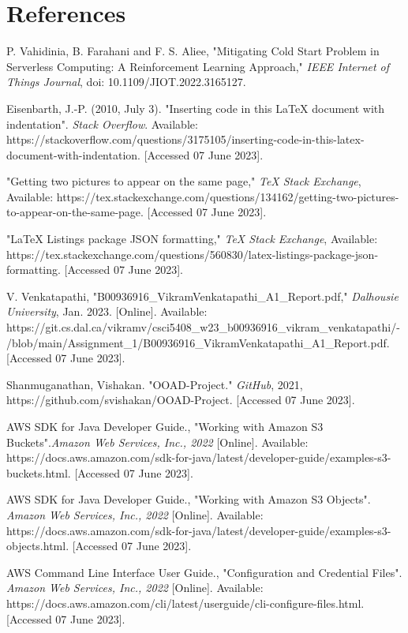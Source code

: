 
\section*{References}
\begin{sloppypar}

  \begin{enumerate}[label={[\arabic*]}]
    \item P.  Vahidinia,  B.  Farahani  and F.  S.  Aliee,  "Mitigating Cold Start  Problem in  Serverless  Computing: A Reinforcement Learning  Approach,"   \textit{IEEE  Internet  of  Things  Journal},  doi: 10.1109/JIOT.2022.3165127.

    \item Eisenbarth, J.-P. (2010, July 3). "Inserting code in this LaTeX document with indentation". \textit{Stack Overflow}. Available: https://stackoverflow.com/questions/3175105/inserting-code-in-this-latex-document-with-indentation. [Accessed 07 June 2023].

    \item "Getting two pictures to appear on the same page," \textit{TeX Stack Exchange}, Available: https://tex.stackexchange.com/questions/134162/getting-two-pictures-to-appear-on-the-same-page. [Accessed 07 June 2023].

    \item "LaTeX Listings package JSON formatting," \textit{TeX Stack Exchange}, Available: https://tex.stackexchange.com/questions/560830/latex-listings-package-json-formatting. [Accessed 07 June 2023].

    \item V. Venkatapathi, "B00936916_VikramVenkatapathi_A1_Report.pdf," \textit{Dalhousie University}, Jan. 2023. [Online]. Available: https://git.cs.dal.ca/vikramv/csci5408_w23_b00936916_vikram_venkatapathi/-/blob/main/Assignment_1/B00936916_VikramVenkatapathi_A1_Report.pdf. [Accessed 07 June 2023].
    
    \item Shanmuganathan, Vishakan. "OOAD-Project." \textit{GitHub}, 2021, https://github.com/svishakan/OOAD-Project. [Accessed 07 June 2023].

    \item AWS SDK for Java Developer Guide., "Working with Amazon S3 Buckets".\textit{Amazon Web Services, Inc., 2022} [Online]. Available: https://docs.aws.amazon.com/sdk-for-java/latest/developer-guide/examples-s3-buckets.html. [Accessed 07 June 2023].

    \item AWS SDK for Java Developer Guide., "Working with Amazon S3 Objects". \textit{Amazon Web Services, Inc., 2022} [Online]. Available: https://docs.aws.amazon.com/sdk-for-java/latest/developer-guide/examples-s3-objects.html. [Accessed 07 June 2023].

    \item AWS Command Line Interface User Guide., "Configuration and Credential Files". \textit{Amazon Web Services, Inc., 2022} [Online]. Available: https://docs.aws.amazon.com/cli/latest/userguide/cli-configure-files.html. [Accessed 07 June 2023].


  \end{enumerate}

\end{sloppypar}
\newpage

